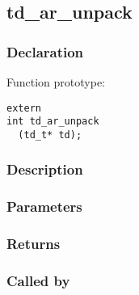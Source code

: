 
\newpage
\subsection{td\_ar\_unpack}
\subsubsection{Declaration} Function prototype:

\begin{verbatim}
extern
int td_ar_unpack
  (td_t* td);
\end{verbatim}

\subsubsection{Description}



\subsubsection{Parameters}
\subsubsection{Returns}
\subsubsection{Called by}

